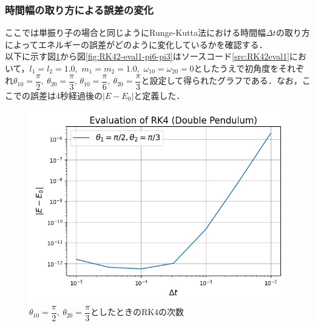 \documentclass[a4paper,11pt]{jsarticle}
\begin{document}
\subsubsection{時間幅の取り方による誤差の変化}
ここでは単振り子の場合と同じようにRunge-Kutta法における時間幅\(\Delta t\)の取り方によってエネルギーの誤差がどのように変化しているかを確認する．\\
以下に示す図\ref{fig:RK42-eval1-pi2-pi3}から図\ref{fig:RK42-eval1-pi6-pi3}はソースコード\ref{src:RK42eval1}において，\(l_1=l_2=1.0\),\ \(m_1=m_2=1.0\),\ \(\omega_{10}=\omega_{20}=0\)としたうえで初角度をそれぞれ\(\theta_{10} = \dfrac{\pi}{2},\ \theta_{20}  = \dfrac{\pi}{3}\), \(\theta_{10} = \dfrac{\pi}{6},\ \theta_{20}  = \dfrac{\pi}{3}\)と設定して得られたグラフである．なお，ここでの誤差は4秒経過後の\(|E-E_0|\)と定義した．\\
\begin{figure}[H]
  \begin{center}
    \includegraphics{figure/RK42/evaluation1/pi2_pi3_2021-2-9-135446.jpeg}
    \caption{\(\theta_{10} = \dfrac{\pi}{2},\ \theta_{20}  = \dfrac{\pi}{3}\)としたときのRK4の次数}
    \label{fig:RK42-eval1-pi2-pi3}
  \end{center}
\end{figure}
\end{document}
